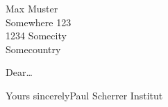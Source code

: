 \documentclass[psi]{scrlttr2}
\begin{document}
\begin{letter}{Max Muster\\
	Somewhere 123\\
	1234 Somecity\\
	Somecountry}


\opening{Dear\ldots}

\lipsum[3]

\lipsum[3]

\lipsum[3]

\closing{Yours sincerely\newline\newline Paul Scherrer Institut}

\end{letter}
\end{document}
